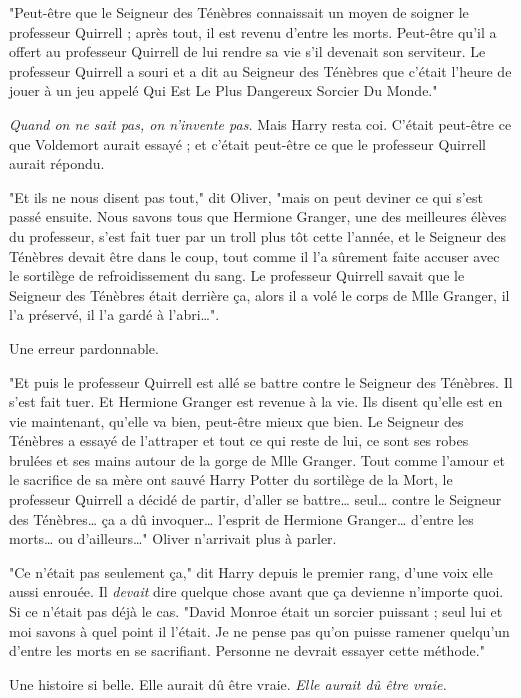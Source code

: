 "Peut-être que le Seigneur des Ténèbres connaissait un moyen de soigner le professeur Quirrell ; après tout, il est revenu d'entre les morts. Peut-être qu'il a offert au professeur Quirrell de lui rendre sa vie s'il devenait son serviteur. Le professeur Quirrell a souri et a dit au Seigneur des Ténèbres que c'était l'heure de jouer à un jeu appelé Qui Est Le Plus Dangereux Sorcier Du Monde."

\emph{Quand on ne sait pas, on n'invente pas.}  Mais Harry resta coi. C'était peut-être ce que Voldemort aurait essayé ; et c'était peut-être ce que le professeur Quirrell aurait répondu.

"Et ils ne nous disent pas tout," dit Oliver, "mais on peut deviner ce qui s'est passé ensuite. Nous savons tous que Hermione Granger, une des meilleures élèves du professeur, s'est fait tuer par un troll plus tôt cette l'année, et le Seigneur des Ténèbres devait être dans le coup, tout comme il l'a sûrement faite accuser avec le sortilège de refroidissement du sang. Le professeur Quirrell savait que le Seigneur des Ténèbres était derrière ça, alors il a volé le corps de Mlle Granger, il l'a préservé, il l'a gardé à l'abri…".

Une erreur pardonnable.

"Et puis le professeur Quirrell est allé se battre contre le Seigneur des Ténèbres. Il s'est fait tuer. Et Hermione Granger est revenue à la vie. Ils disent qu'elle est en vie maintenant, qu'elle va bien, peut-être mieux que bien. Le Seigneur des Ténèbres a essayé de l'attraper et tout ce qui reste de lui, ce sont ses robes brulées et ses mains autour de la gorge de Mlle Granger. Tout comme l'amour et le sacrifice de sa mère ont sauvé Harry Potter du sortilège de la Mort, le professeur Quirrell a décidé de partir, d'aller se battre… seul… contre le Seigneur des Ténèbres… ça a dû invoquer… l'esprit de Hermione Granger… d'entre les morts… ou d'ailleurs…" Oliver n'arrivait plus à parler.

"Ce n'était pas seulement ça," dit Harry depuis le premier rang, d'une voix elle aussi enrouée. Il \emph{devait}  dire quelque chose avant que ça devienne n'importe quoi. Si ce n'était pas déjà le cas. "David Monroe était un sorcier puissant ; seul lui et moi savons à quel point il l'était. Je ne pense pas qu'on puisse ramener quelqu'un d'entre les morts en se sacrifiant. Personne ne devrait essayer cette méthode."

Une histoire si belle. Elle aurait dû être vraie. \emph{Elle aurait dû être vraie.} 

